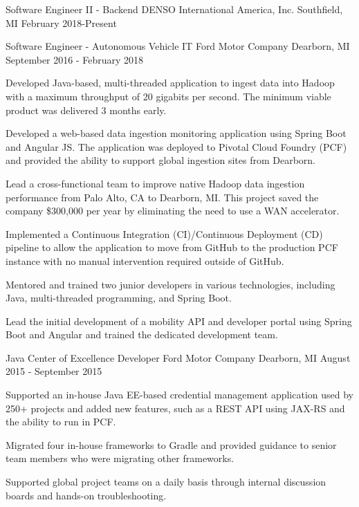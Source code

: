 \documentclass[11pt, a4paper]{awesome-cv}
\begin{document}
\makecvheader[C]

\begin{cventries}
    \cventry
    {Software Engineer II - Backend}
    {DENSO International America, Inc.}
    {Southfield, MI}
    {February 2018-Present}
    {}

	\cventry
	{Software Engineer - Autonomous Vehicle IT}
	{Ford Motor Company}
	{Dearborn, MI}
	{September 2016 - February 2018}
	{
		\begin{cvitems}
			\item{Developed Java-based, multi-threaded application to ingest data into Hadoop with a maximum throughput of 20 gigabits per second. The minimum viable product was delivered 
				  3 months early.}
			\item{Developed a web-based data ingestion monitoring application using Spring Boot and Angular JS. The application was deployed to Pivotal Cloud Foundry (PCF) and provided the 
				  ability to support global ingestion sites from Dearborn.}
			\item{Lead a cross-functional team to improve native Hadoop data ingestion performance from Palo Alto, CA to Dearborn, MI. This project saved the company \$300,000 per year by 
				  eliminating the need to use a WAN accelerator.}
			\item{Implemented a Continuous Integration (CI)/Continuous Deployment (CD) pipeline to allow the application to move from GitHub to the production PCF instance with no manual 
				  intervention required outside of GitHub.}
			\item{Mentored and trained two junior developers in various technologies, including Java, multi-threaded programming, and Spring Boot.}
			\item{Lead the initial development of a mobility API and developer portal using Spring Boot and Angular and trained the dedicated development team.}
		\end{cvitems}
	}
	
	\cventry
	{Java Center of Excellence Developer}
	{Ford Motor Company}
	{Dearborn, MI}
	{August 2015 - September 2015}
	{
		\begin{cvitems}
			\item{Supported an in-house Java EE-based credential management application used by 250+ projects and added new features, such as a REST API using JAX-RS and the ability to run 
				  in PCF.}
			\item{Migrated four in-house frameworks to Gradle and provided guidance to senior team members who were migrating other frameworks.}
			\item{Supported global project teams on a daily basis through internal discussion boards and hands-on troubleshooting.}
		\end{cvitems}
	}
	

\end{cventries}
\end{document}
